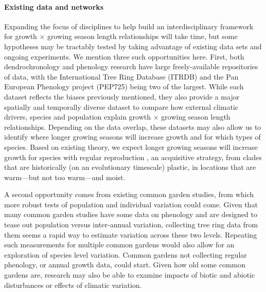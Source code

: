 \documentclass[11pt]{article}
\begin{document}
\paragraph{Existing data and networks}

Expanding the focus of disciplines to help build an interdisciplinary framework for growth $\times$ growing season length relationships will take time, but some hypotheses may be tractably tested by taking advantage of existing data sets and ongoing experiments. We mention three such opportunities here. First, both dendrochronology and phenology research have large freely-available repositories of data, with the International Tree Ring Database (ITRDB) and the Pan European Phenology project (PEP725) being two of the largest. While each dataset reflects the biases previously mentioned, they also provide a major spatially and temporally diverse dataset to compare how external climatic drivers, species and population explain growth $\times$ growing season length relationships. Depending on the data overlap, these datasets may also allow us to identify  where longer growing seasons will increase growth and for which types of species. Based on existing theory, we expect longer growing seasons will increase growth for species with regular reproduction \citep[no masting, see also new masting database in][]{hacket2022mastree+}, an acquisitive strategy, from clades that are historically (on an evolutionary timescale) plastic, in locations that are warm---but not too warm---and moist. %

A second opportunity comes from existing common garden studies, from which more robust tests of population and individual variation could come. Given that many common garden studies have some data on phenology and are designed to tease out population versus inter-annual variation, collecting tree ring data from them seems a rapid way to estimate variation across these two levels. Repeating such measurements for multiple common gardens would also allow for an exploration of species level variation. Common gardens not collecting regular phenology, or annual growth data, could start. Given how old some common gardens are, research may also be able to examine impacts of biotic and abiotic disturbances or effects of climatic variation. 
\end{document}
